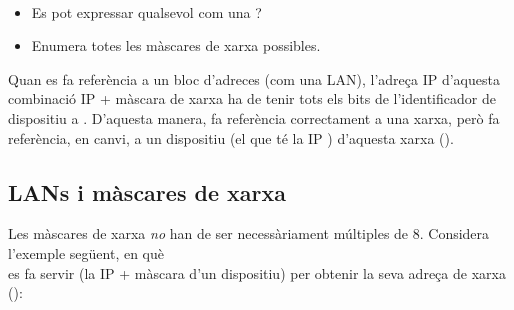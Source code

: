 \begin{exercise}\ \\[-0.65cm]
\begin{itemize}
\item Es pot expressar qualsevol  com una ?
\item Enumera totes les màscares de xarxa possibles.\\[-0.5cm]
\end{itemize}
\end{exercise}

Quan es fa referència a un bloc d'adreces (com una LAN), 
l'adreça IP d'aquesta combinació IP + màscara de xarxa
ha de tenir tots els bits de l'identificador de dispositiu a . 
D'aquesta manera,  fa referència correctament a una xarxa, però
 fa referència, en canvi, a un dispositiu 
(el que té la IP ) d'aquesta xarxa ().

\subsection{LANs i màscares de xarxa}\label{sec:layer3:lans_and_netmasks}

Les màscares de xarxa \textit{no} han de ser necessàriament múltiples de $8$. Considera l'exemple següent, en què \\
es fa servir  (la IP + màscara d'un dispositiu) per obtenir la seva adreça de xarxa\\
():\\

